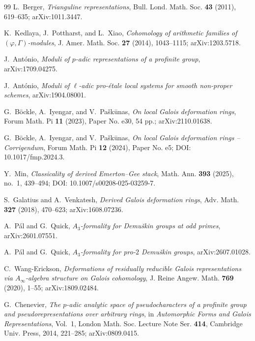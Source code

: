 \documentclass[11pt]{article}
\theoremstyle{definition}
\begin{document}
\begin{thebibliography}{99}
L.~Berger,
\emph{Trianguline representations},
Bull. Lond. Math. Soc. \textbf{43} (2011), 619--635; arXiv:1011.3447.

K.~Kedlaya, J.~Pottharst, and L.~Xiao,
\emph{Cohomology of arithmetic families of $(\varphi,\Gamma)$-modules},
J. Amer. Math. Soc. \textbf{27} (2014), 1043--1115; arXiv:1203.5718.

J.~Ant\'onio,
\emph{Moduli of $p$-adic representations of a profinite group},
arXiv:1709.04275.

J.~Ant\'onio,
\emph{Moduli of $\ell$-adic pro-\'etale local systems for smooth non-proper schemes},
arXiv:1904.08001.

G.~B\"ockle, A.~Iyengar, and V.~Pa\v{s}k\=unas,
\emph{On local Galois deformation rings},
Forum Math. Pi \textbf{11} (2023), Paper No. e30, 54 pp.; arXiv:2110.01638.

G.~B\"ockle, A.~Iyengar, and V.~Pa\v{s}k\=unas,
\emph{On local Galois deformation rings -- Corrigendum},
Forum Math. Pi \textbf{12} (2024), Paper No. e5; DOI: 10.1017/fmp.2024.3.

Y.~Min,
\emph{Classicality of derived Emerton--Gee stack},
Math. Ann. \textbf{393} (2025), no.~1, 439--494; DOI: 10.1007/s00208-025-03259-7.

S.~Galatius and A.~Venkatesh,
\emph{Derived Galois deformation rings},
Adv. Math. \textbf{327} (2018), 470--623; arXiv:1608.07236.

A.~P\'al and G.~Quick,
\emph{$A_3$-formality for Demu\v{s}kin groups at odd primes},
arXiv:2601.07551.

A.~P\'al and G.~Quick,
\emph{$A_3$-formality for pro-$2$ Demu\v{s}kin groups},
arXiv:2607.01028.

C.~Wang-Erickson,
\emph{Deformations of residually reducible Galois representations via $A_\infty$-algebra structure on Galois cohomology},
J. Reine Angew. Math. \textbf{769} (2020), 1--55; arXiv:1809.02484.

G.~Chenevier,
\emph{The $p$-adic analytic space of pseudocharacters of a profinite group and pseudorepresentations over arbitrary rings},
in \emph{Automorphic Forms and Galois Representations}, Vol.~1,
London Math. Soc. Lecture Note Ser. \textbf{414}, Cambridge Univ. Press, 2014, 221--285; arXiv:0809.0415.


\end{thebibliography}
\end{document}
